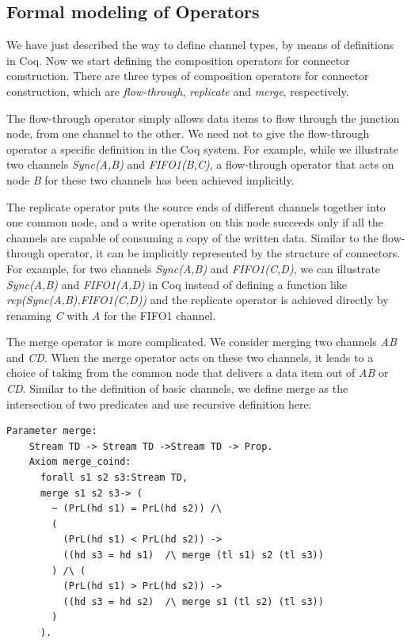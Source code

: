 \documentclass[3p,times]{elsarticle}
\begin{document}
\subsection{Formal modeling of Operators}
We have just described the way to define channel types, by means of definitions in Coq. Now we start defining the composition operators for connector construction. There are three types of composition operators for connector construction, which are \emph{flow-through}, \emph{replicate} and \emph{merge}, respectively.

The flow-through operator simply allows data items to flow through the junction node, from one channel to the other. We need not to give the flow-through operator a specific definition in the Coq system. For example, while we illustrate two channels \emph{Sync(A,B)} and \emph{FIFO1(B,C)}, a flow-through operator that acts on node \emph{B} for these two channels has been achieved implicitly.

The replicate operator puts the source ends of different channels together into one common node, and a write operation on this node succeeds only if all the channels are capable of consuming a copy of the written data. %
Similar to the flow-through operator, it can be implicitly represented by the structure of connectors. For example, for two channels \emph{Sync(A,B)} and \emph{FIFO1(C,D)}, we can illustrate \emph{Sync(A,B)} and \emph{FIFO1(A,D)} in Coq instead of defining a function like \emph{rep(Sync(A,B),FIFO1(C,D))} and the replicate operator is achieved directly by renaming \emph{C} with \emph{A} for the FIFO1 channel.

The merge operator is more complicated. We consider merging two
channels \emph{AB} and \emph{CD}. When the merge operator acts on
these two channels, it leads to a choice of taking from the common
node that delivers a data item out of \emph{AB} or \emph{CD}.
Similar to the definition of basic channels, we define merge as the intersection of two predicates and use recursive definition here:
\begin{lstlisting}[language=coq]
    Parameter merge:
    Stream TD -> Stream TD ->Stream TD -> Prop.
    Axiom merge_coind:
      forall s1 s2 s3:Stream TD,
      merge s1 s2 s3-> (
        ~ (PrL(hd s1) = PrL(hd s2)) /\
        (
          (PrL(hd s1) < PrL(hd s2)) ->
          ((hd s3 = hd s1)  /\ merge (tl s1) s2 (tl s3))
        ) /\ (
          (PrL(hd s1) > PrL(hd s2)) ->
          ((hd s3 = hd s2)  /\ merge s1 (tl s2) (tl s3))
        )
      ).
\end{lstlisting}
\end{document}
